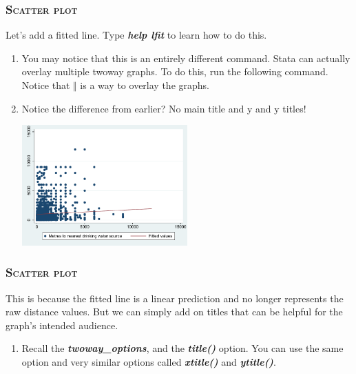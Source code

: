 \documentclass[10pt]{beamer}
\begin{document}
	\begin{frame}
	\frametitle{\textsc{Scatter plot}}	
		 Let's add a fitted line. Type \textbf{\textit{help lfit}} to learn how to do this.
		\begin{enumerate}
			  \item You may notice that this is an entirely different command. 
								Stata can actually overlay multiple twoway graphs. 
								To do this, run the following command.
								Notice that \textbf{$\Vert$} is a way to overlay the graphs.
		
\begin{stlog}\end{stlog}
			\vspace{1mm}
			 \item Notice the difference from earlier? No main title and y and y titles!
			\vspace{1mm}
		
\begin{center}
    \includegraphics[width=0.5\textwidth]{scatter_3.pdf}
\end{center}
		\end{enumerate}
	\end{frame}

	\begin{frame}
	\frametitle{\textsc{Scatter plot}}	
		 This is because the fitted line is a linear prediction and 
					 no longer represents the raw distance values. 
					 But we can simply add on titles that can be helpful for the graph's intended audience.
		\begin{enumerate}
			  \item Recall the \textbf{\textit{twoway\_options}}, and the \textbf{\textit{title()}} option.
								You can use the same option and very similar options called \textbf{\textit{xtitle()}} and
								\textbf{\textit{ytitle()}}.
		
\begin{stlog}\end{stlog}
		\end{enumerate}
	\end{frame}
	
\end{document}

